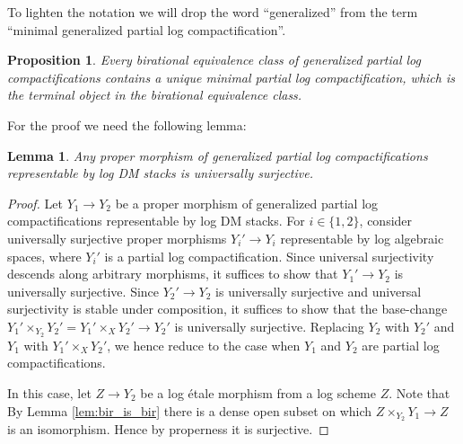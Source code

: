 \documentclass[11pt]{amsart}
\newtheorem{proposition}[theorem]{Proposition}
\newtheorem{lemma}[theorem]{Lemma}
\theoremstyle{definition}
\theoremstyle{remark}
\begin{document}
To lighten the notation we will drop the word ``generalized''
from the term ``minimal generalized partial log compactification''.

\begin{proposition}
	\label{prop:exists_unique_minimal_log_cpt}
	Every birational equivalence class of generalized partial log
	compactifications contains a unique minimal partial log compactification,
	which is the terminal object in the birational equivalence
	class.
\end{proposition}

For the proof we need the following lemma:

\begin{lemma}
	Any proper morphism of generalized partial log compactifications
	representable by log DM stacks is universally surjective.
\end{lemma}

\begin{proof}
	Let $Y_1\to Y_2$ be a proper morphism of generalized partial
	log compactifications representable by log DM stacks.
	For $i\in \{1,2\}$, consider universally surjective proper morphisms
	$Y_{i}'\to Y_i$ representable by log algebraic spaces,
	where $Y_{i}'$ is a partial log compactification. Since universal
	surjectivity descends along arbitrary morphisms,
	it suffices to show that $Y_1'\to Y_2$ is universally surjective.
	Since $Y_2'\to Y_2$ is universally surjective and universal
	surjectivity is stable under composition, it suffices to
	show that the base-change $Y_1'\times_{Y_2}Y_2'=Y_1'\times_{X}Y_2'\to Y_2'$ is
	universally surjective. Replacing $Y_2$ with $Y_2'$ and
	$Y_1$ with $Y_1'\times_{X}Y_2'$, we hence reduce to the case
	when $Y_1$ and $Y_2$ are partial log compactifications.

	In this case, let $Z\to Y_2$ be a log étale morphism from a
	log scheme $Z$. Note that
	By Lemma \ref{lem:bir_is_bir} there is a dense open subset
	on which $Z\times_{Y_2}Y_1\to Z$ is an
	isomorphism. Hence by properness it is surjective.
\end{proof}
\end{document}
